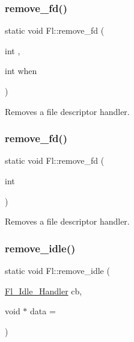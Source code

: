 \subsubsection{\texorpdfstring{remove\+\_\+fd()}{remove\_fd()}\hspace{0.1cm}{\footnotesize\ttfamily [1/2]}}
{\footnotesize\ttfamily static void Fl\+::remove\+\_\+fd (\begin{DoxyParamCaption}\item[{int}]{,  }\item[{int}]{when }\end{DoxyParamCaption})\hspace{0.3cm}{\ttfamily [static]}}

Removes a file descriptor handler. \mbox{\label{class_fl_a4254e8bc88b9d4cb3e66152ac4caee86}} 
\subsubsection{\texorpdfstring{remove\+\_\+fd()}{remove\_fd()}\hspace{0.1cm}{\footnotesize\ttfamily [2/2]}}
{\footnotesize\ttfamily static void Fl\+::remove\+\_\+fd (\begin{DoxyParamCaption}\item[{int}]{ }\end{DoxyParamCaption})\hspace{0.3cm}{\ttfamily [static]}}

Removes a file descriptor handler. \mbox{\label{class_fl_acd760509598e72ba9a1e725fdd1a66c9}} 
\subsubsection{\texorpdfstring{remove\+\_\+idle()}{remove\_idle()}}
{\footnotesize\ttfamily static void Fl\+::remove\+\_\+idle (\begin{DoxyParamCaption}\item[{\hyperlink{group__callback__functions_gac9d2aab1d3142308450e2da09716013e}{Fl\+\_\+\+Idle\+\_\+\+Handler}}]{cb,  }\item[{void $\ast$}]{data = {} }\end{DoxyParamCaption})\hspace{0.3cm}{\ttfamily [static]}}

